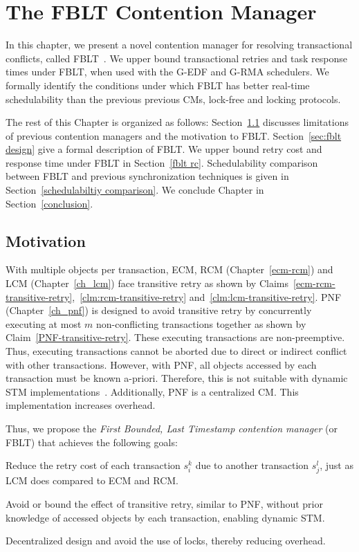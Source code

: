 \chapter{\label{ch_fblt}The FBLT Contention Manager}

In this chapter, we present a novel contention manager for resolving transactional conflicts, called FBLT~\cite{6513719}. We upper bound transactional retries and task response times under FBLT, when used with the G-EDF and  G-RMA schedulers. We formally identify the conditions under which FBLT has better real-time schedulability than the previous previous CMs, lock-free and locking protocols.

The rest of this Chapter is organized as follows: Section~\ref{sec:motivation} discusses limitations of previous contention managers and the motivation to FBLT. Section~\ref{sec:fblt design} give a formal description of FBLT. We upper bound retry cost and response time under FBLT in Section~\ref{fblt rc}. Schedulability comparison between FBLT and previous synchronization techniques is given in Section~\ref{schedulabiltiy comparison}. We conclude Chapter in Section~\ref{conclusion}.
%
\section{Motivation}\label{sec:motivation}
%
With multiple objects per transaction, ECM, RCM (Chapter~\ref{ecm-rcm}) and LCM (Chapter~\ref{ch_lcm}) face transitive retry as shown by Claims~\ref{ecm-rcm-transitive-retry},~\ref{clm:rcm-transitive-retry} and~\ref{clm:lcm-transitive-retry}. PNF (Chapter~\ref{ch_pnf}) is designed to avoid transitive retry by concurrently executing at most $m$ non-conflicting transactions together as shown by Claim~\ref{PNF-transitive-retry}. These executing transactions are non-preemptive. Thus, executing transactions cannot be aborted due to direct or indirect conflict with other transactions. However, with PNF, all objects accessed by each transaction must be known a-priori. Therefore, this is not suitable with dynamic STM implementations~\cite{Herlihy:2003:STM:872035.872048}. Additionally, PNF is a centralized CM. This implementation increases overhead. 

Thus, we propose the \textit{First Bounded, Last Timestamp contention manager} (or FBLT) that achieves the following goals:
\begin{compactenum}
\item \label{goal 1} Reduce the retry cost of each transaction $s_i^k$ due to another transaction $s_j^l$, just as LCM does compared to ECM and RCM.
\item \label{goal 2} Avoid or bound the effect of transitive retry, similar to PNF, without prior knowledge of accessed objects by each transaction, enabling dynamic STM.
\item \label{goal 3} Decentralized design and avoid the use of locks, thereby reducing  overhead.
\end{compactenum}
%
